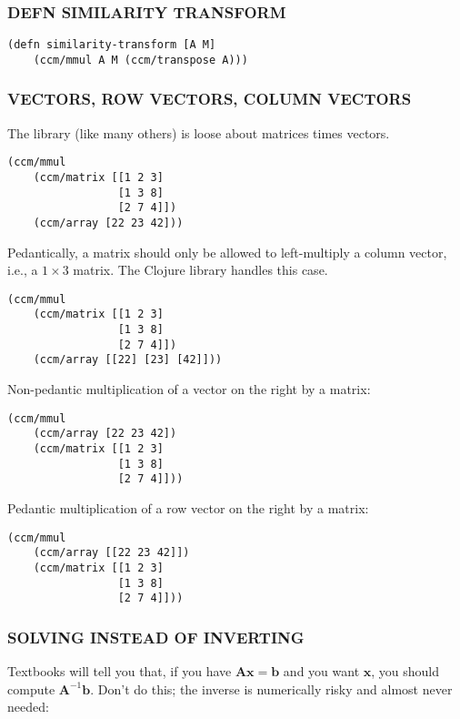 \documentclass[10pt,oneside,x11names]{article}
\begin{document}
\subsubsection{DEFN SIMILARITY TRANSFORM}
\label{similarity-transform}
\begin{verbatim}
(defn similarity-transform [A M]
    (ccm/mmul A M (ccm/transpose A)))
\end{verbatim}

\subsubsection{VECTORS, ROW VECTORS, COLUMN VECTORS}
\label{vectors-row-vectors-column-vectors}
The library (like many others) is loose about matrices times vectors.

\begin{verbatim}
(ccm/mmul
    (ccm/matrix [[1 2 3]
                 [1 3 8]
                 [2 7 4]])
    (ccm/array [22 23 42]))
\end{verbatim}

Pedantically, a matrix should only be allowed to left-multiply a column
vector, i.e., a \(1\times{3}\) matrix. The Clojure library handles this
case.

\begin{verbatim}
(ccm/mmul
    (ccm/matrix [[1 2 3]
                 [1 3 8]
                 [2 7 4]])
    (ccm/array [[22] [23] [42]]))
\end{verbatim}

Non-pedantic multiplication of a vector on the right by a matrix:

\begin{verbatim}
(ccm/mmul
    (ccm/array [22 23 42])
    (ccm/matrix [[1 2 3]
                 [1 3 8]
                 [2 7 4]]))
\end{verbatim}

Pedantic multiplication of a row vector on the right by a matrix:

\begin{verbatim}
(ccm/mmul
    (ccm/array [[22 23 42]])
    (ccm/matrix [[1 2 3]
                 [1 3 8]
                 [2 7 4]]))
\end{verbatim}

\subsubsection{SOLVING INSTEAD OF INVERTING}
\label{solving-instead-of-inverting}
Textbooks will tell you that, if you have
\(\boldsymbol{A}\boldsymbol{x}=\boldsymbol{b}\) and you want
\(\boldsymbol{x}\), you should compute
\(\boldsymbol{A}^{-1}\boldsymbol{b}\). Don't do this; the inverse is
numerically risky and almost never needed:
\end{document}

